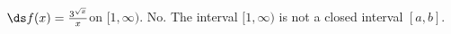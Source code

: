 {$\ds f(x) = \frac{3^{\sqrt{x}}}{x}$\quad  on \quad $[1,\infty)$.
}
{No.  The interval $[1,\infty)$ is not a closed interval $[a,b]$.
}

